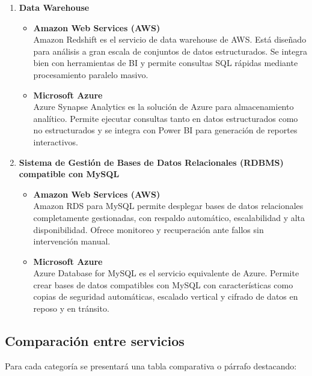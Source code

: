 \documentclass[12pt]{article}
\begin{document}
\begin{enumerate}[label=\arabic*.]
\begin{itemize}
			\item \textbf{Microsoft Azure} \\
			Azure Blob Storage es la solución de almacenamiento de objetos de Azure. Permite guardar grandes volúmenes de datos no estructurados y también cuenta con diferentes niveles de acceso (hot, cool, archive) para optimizar costos.
		\end{itemize}
		
		\item \textbf{Data Warehouse}
		\begin{itemize}
			\item \textbf{Amazon Web Services (AWS)} \\
			Amazon Redshift es el servicio de data warehouse de AWS. Está diseñado para análisis a gran escala de conjuntos de datos estructurados. Se integra bien con herramientas de BI y permite consultas SQL rápidas mediante procesamiento paralelo masivo.
			
			\item \textbf{Microsoft Azure} \\
			Azure Synapse Analytics es la solución de Azure para almacenamiento analítico. Permite ejecutar consultas tanto en datos estructurados como no estructurados y se integra con Power BI para generación de reportes interactivos.
		\end{itemize}
		
		\item \textbf{Sistema de Gestión de Bases de Datos Relacionales (RDBMS) compatible con MySQL}
		\begin{itemize}
			\item \textbf{Amazon Web Services (AWS)} \\
			Amazon RDS para MySQL permite desplegar bases de datos relacionales completamente gestionadas, con respaldo automático, escalabilidad y alta disponibilidad. Ofrece monitoreo y recuperación ante fallos sin intervención manual.
			
			\item \textbf{Microsoft Azure} \\
			Azure Database for MySQL es el servicio equivalente de Azure. Permite crear bases de datos compatibles con MySQL con características como copias de seguridad automáticas, escalado vertical y cifrado de datos en reposo y en tránsito.
		\end{itemize}
	\end{enumerate}
	
	\subsection{Comparación entre servicios}
	Para cada categoría se presentará una tabla comparativa o párrafo destacando:
	
\end{document}
